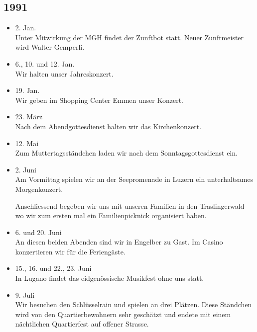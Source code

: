\subsection*{1991}

\begin{history}


    \begin{itemize}

        \item 2. Jan.\\
              Unter Mitwirkung der MGH findet der Zunftbot statt. Neuer Zunftmeister
              wird Walter Gemperli.

        \item 6., 10. und 12. Jan.\\
              Wir halten unser Jahreskonzert.

        \item 19. Jan.\\
              Wir geben im Shopping Center Emmen unser Konzert.

        \item 23. März\\
              Nach dem Abendgottesdienst halten wir das Kirchenkonzert.

        \item 12. Mai\\
              Zum Muttertagsständchen laden wir nach dem Sonntagsgottesdienst ein.

        \item 2. Juni\\
              Am Vormittag spielen wir an der Seepromenade in Luzern ein
              unterhaltsames Morgenkonzert.

              Anschliessend begeben wir uns mit unseren Familien in den Traslingerwald
              wo wir zum ersten mal ein Familienpicknick organisiert haben.

        \item 6. und 20. Juni\\
              An diesen beiden Abenden sind wir in Engelber zu Gast. Im Casino
              konzertieren wir für die Feriengäste.

        \item 15., 16. und 22., 23. Juni\\
              In Lugano findet das eidgenössische Musikfest ohne uns statt.

        \item 9. Juli\\
              Wir besuchen den Schlüsselrain und spielen an drei Plätzen. Diese
              Ständchen wird von den Quartierbewohnern sehr geschätzt und endete mit
              einem nächtlichen Quartierfest auf offener Strasse.


\end{itemize}
\end{history}
